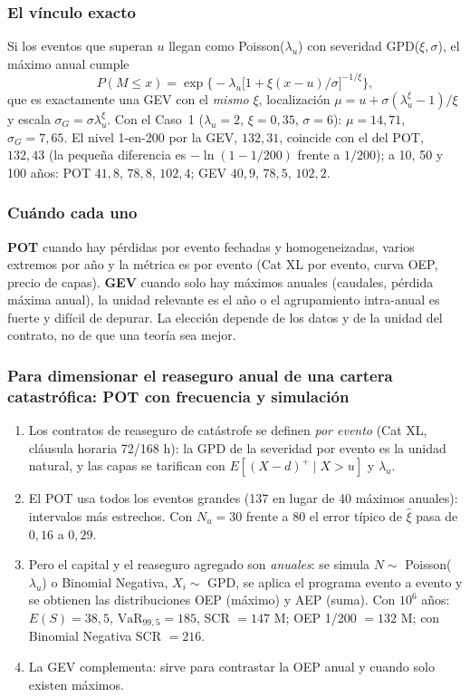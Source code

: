 \documentclass[a4paper,12pt]{article}
\newcommand{\euro}{\texteuro}
\newcommand{\VaR}{\mathrm{VaR}}
\begin{document}
\subsubsection*{El v\'inculo exacto}
Si los eventos que superan $u$ llegan como Poisson($\lambda_u$) con severidad GPD($\xi,\sigma$), el m\'aximo anual cumple
\[
P(M\le x)=\exp\Big\{-\lambda_u\big[1+\xi(x-u)/\sigma\big]^{-1/\xi}\Big\},
\]
que es exactamente una GEV con el \emph{mismo} $\xi$, localizaci\'on $\mu=u+\sigma(\lambda_u^{\xi}-1)/\xi$ y escala $\sigma_G=\sigma\lambda_u^{\xi}$. Con el Caso~1 ($\lambda_u=2$, $\xi=0{,}35$, $\sigma=6$): $\mu=14{,}71$, $\sigma_G=7{,}65$. El nivel 1-en-200 por la GEV, $132{,}31$, coincide con el del POT, $132{,}43$ (la peque\~na diferencia es $-\ln(1-1/200)$ frente a $1/200$); a 10, 50 y 100 a\~nos: POT $41{,}8$, $78{,}8$, $102{,}4$; GEV $40{,}9$, $78{,}5$, $102{,}2$.

\subsubsection*{Cu\'ando cada uno}
\textbf{POT} cuando hay p\'erdidas por evento fechadas y homogeneizadas, varios extremos por a\~no y la m\'etrica es por evento (Cat XL por evento, curva OEP, precio de capas). \textbf{GEV} cuando solo hay m\'aximos anuales (caudales, p\'erdida m\'axima anual), la unidad relevante es el a\~no o el agrupamiento intra-anual es fuerte y dif\'icil de depurar. La elecci\'on depende de los datos y de la unidad del contrato, no de que una teor\'ia sea mejor.

\subsubsection*{Para dimensionar el reaseguro anual de una cartera catastr\'ofica: POT con frecuencia y simulaci\'on}
\begin{enumerate}[leftmargin=*,itemsep=2pt]
\item Los contratos de reaseguro de cat\'astrofe se definen \emph{por evento} (Cat XL, cl\'ausula horaria 72/168 h): la GPD de la severidad por evento es la unidad natural, y las capas se tarifican con $E[(X-d)^+\mid X>u]$ y $\lambda_u$.
\item El POT usa todos los eventos grandes (137 en lugar de 40 m\'aximos anuales): intervalos m\'as estrechos. Con $N_u=30$ frente a $80$ el error t\'ipico de $\hat\xi$ pasa de $0{,}16$ a $0{,}29$.
\item Pero el capital y el reaseguro agregado son \emph{anuales}: se simula $N\sim$ Poisson($\lambda_u$) o Binomial Negativa, $X_i\sim$ GPD, se aplica el programa evento a evento y se obtienen las distribuciones OEP (m\'aximo) y AEP (suma). Con $10^6$ a\~nos: $E(S)=38{,}5$, $\VaR_{99,5}=185$, SCR $=147$ M\euro; OEP 1/200 $=132$ M\euro; con Binomial Negativa SCR $=216$.
\item La GEV complementa: sirve para contrastar la OEP anual y cuando solo existen m\'aximos.
\end{enumerate}
\end{document}
